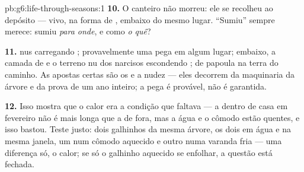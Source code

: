 \begin{solution}{pb:g6:life-through-seasons:1}
\textbf{10.} O canteiro não morreu: ele se recolheu ao depósito ---
vivo, na forma de , embaixo do mesmo lugar. ``Sumiu'' sempre
merece: sumiu \emph{para onde}, e como \emph{o quê}?

\textbf{11.}  nus carregando ; provavelmente uma pega em
algum lugar; embaixo, a camada de  e o terreno nu dos narcisos
escondendo ;  de papoula na terra do caminho. As
apostas certas são os  e a nudez --- eles decorrem da
maquinaria  da árvore e da prova de um ano inteiro; a pega
é provável, não é garantida.

\textbf{12.} Isso mostra que o calor era a condição que faltava --- a
 dentro de casa em fevereiro não é mais longa que a de fora, mas a
água e o cômodo estão quentes, e isso bastou. Teste justo: dois
galhinhos da mesma árvore, os dois em água e na mesma janela, um num
cômodo aquecido e outro numa varanda fria --- uma diferença só, o
calor; se só o galhinho aquecido se enfolhar, a questão está fechada.
\end{solution}
